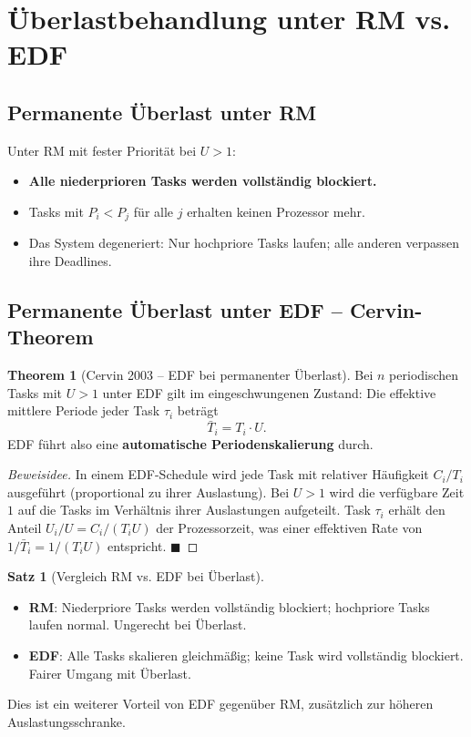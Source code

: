 ﻿\documentclass[a4paper,12pt]{report}
\theoremstyle{definition}
\newtheorem{satz}{Satz}[chapter]
\newtheorem{theorem}{Theorem}[chapter]
\begin{document}
\section{Überlastbehandlung unter RM vs. EDF}

\subsection{Permanente Überlast unter RM}

Unter RM mit fester Priorität bei $U > 1$:
\begin{itemize}
	\item \textbf{Alle niederprioren Tasks werden vollständig blockiert.}
	\item Tasks mit $P_i < P_j$ für alle $j$ erhalten keinen Prozessor mehr.
	\item Das System degeneriert: Nur hochpriore Tasks laufen; alle anderen
	      verpassen ihre Deadlines.
\end{itemize}

\subsection{Permanente Überlast unter EDF -- Cervin-Theorem}

\begin{theorem}[Cervin 2003 -- EDF bei permanenter Überlast]
	\label{thm:cervin}
	Bei $n$ periodischen Tasks mit $U > 1$ unter EDF gilt im eingeschwungenen
	Zustand: Die effektive mittlere Periode jeder Task $\tau_i$ beträgt
	\[
		\bar{T}_i = T_i \cdot U.
	\]
	EDF führt also eine \textbf{automatische Periodenskalierung} durch.
\end{theorem}

\begin{proof}[Beweisidee]
	In einem EDF-Schedule wird jede Task mit relativer Häufigkeit $C_i/T_i$ ausgeführt
	(proportional zu ihrer Auslastung). Bei $U > 1$ wird die verfügbare Zeit $1$ auf
	die Tasks im Verhältnis ihrer Auslastungen aufgeteilt. Task $\tau_i$ erhält den
	Anteil $U_i/U = C_i/(T_i U)$ der Prozessorzeit, was einer effektiven Rate von
	$1/\bar{T}_i = 1/(T_i U)$ entspricht. \hfill$\blacksquare$
\end{proof}

\begin{satz}[Vergleich RM vs. EDF bei Überlast]
	\begin{itemize}
		\item \textbf{RM}: Niederpriore Tasks werden vollständig blockiert;
		      hochpriore Tasks laufen normal. Ungerecht bei Überlast.
		\item \textbf{EDF}: Alle Tasks skalieren gleichmäßig; keine Task wird
		      vollständig blockiert. Fairer Umgang mit Überlast.
	\end{itemize}
	Dies ist ein weiterer Vorteil von EDF gegenüber RM, zusätzlich zur höheren
	Auslastungsschranke.
\end{satz}
\end{document}
